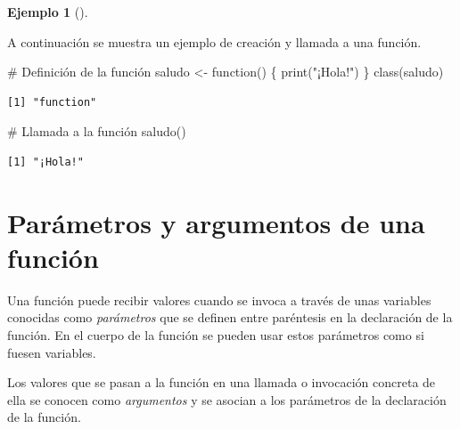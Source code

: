 \documentclass[
  a4paper,
]{scrreport}
\newenvironment{Shaded}{\begin{snugshade}}{\end{snugshade}}
\newcommand{\CommentTok}[1]{\textcolor[rgb]{0.37,0.37,0.37}{#1}}
\newcommand{\ControlFlowTok}[1]{\textcolor[rgb]{0.00,0.23,0.31}{#1}}
\newcommand{\FunctionTok}[1]{\textcolor[rgb]{0.28,0.35,0.67}{#1}}
\newcommand{\NormalTok}[1]{\textcolor[rgb]{0.00,0.23,0.31}{#1}}
\newcommand{\OtherTok}[1]{\textcolor[rgb]{0.00,0.23,0.31}{#1}}
\newcommand{\StringTok}[1]{\textcolor[rgb]{0.13,0.47,0.30}{#1}}
\theoremstyle{definition}
\theoremstyle{definition}
\newtheorem{example}{Ejemplo}[chapter]
\theoremstyle{remark}
\begin{document}
\leavevmode{}%
\begin{example}[]\label{exm-creacion-funcion}

A continuación se muestra un ejemplo de creación y llamada a una
función.

\begin{Shaded}
\begin{Highlighting}[]
\CommentTok{\# Definición de la función}
\NormalTok{saludo }\OtherTok{\textless{}{-}} \ControlFlowTok{function}\NormalTok{() \{}
  \FunctionTok{print}\NormalTok{(}\StringTok{"¡Hola!"}\NormalTok{)}
\NormalTok{\}}
\FunctionTok{class}\NormalTok{(saludo)}
\end{Highlighting}
\end{Shaded}

\begin{verbatim}
[1] "function"
\end{verbatim}

\begin{Shaded}
\begin{Highlighting}[]
\CommentTok{\# Llamada a la función}
\FunctionTok{saludo}\NormalTok{()}
\end{Highlighting}
\end{Shaded}

\begin{verbatim}
[1] "¡Hola!"
\end{verbatim}

\end{example}

\hypertarget{paruxe1metros-y-argumentos-de-una-funciuxf3n}{%
\section{Parámetros y argumentos de una
función}\label{paruxe1metros-y-argumentos-de-una-funciuxf3n}}

Una función puede recibir valores cuando se invoca a través de unas
variables conocidas como \emph{parámetros} que se definen entre
paréntesis en la declaración de la función. En el cuerpo de la función
se pueden usar estos parámetros como si fuesen variables.

Los valores que se pasan a la función en una llamada o invocación
concreta de ella se conocen como \emph{argumentos} y se asocian a los
parámetros de la declaración de la función.
\end{document}
